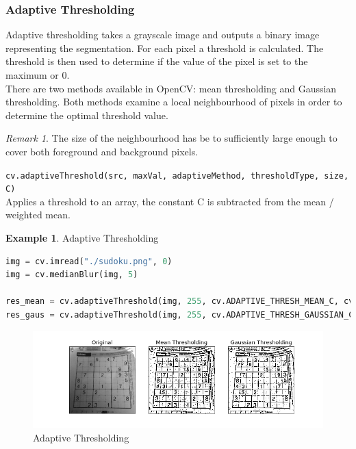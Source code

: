\documentclass{article}
\theoremstyle{definition}
\newtheorem{ex}{Example}[subsection]
\theoremstyle{remark}
\newtheorem*{rem}{Remark}
\newcommand{\func}[2]{\noindent\lstinline{#1}\\#2}
\begin{document}
\subsubsection{Adaptive Thresholding}

Adaptive thresholding takes a grayscale image and outputs a binary image representing the segmentation. For each pixel a threshold is calculated. The threshold is then used to determine if the value of the pixel is set to the maximum or 0.\\

There are two methods available in OpenCV: mean thresholding and Gaussian thresholding. Both methods examine a local neighbourhood of pixels in order to determine the optimal threshold value.\\

\begin{rem}
The size of the neighbourhood has be to sufficiently large enough to cover both foreground and background pixels.\\
\end{rem}


\func{cv.adaptiveThreshold(src, maxVal, adaptiveMethod, thresholdType, size, C)}{Applies a threshold to an array, the constant C is subtracted from the mean / weighted mean.}


\begin{ex} Adaptive Thresholding
\begin{lstlisting}[language=Python]
img = cv.imread("./sudoku.png", 0)
img = cv.medianBlur(img, 5)

res_mean = cv.adaptiveThreshold(img, 255, cv.ADAPTIVE_THRESH_MEAN_C, cv.THRESH_BINARY, 11, 2)
res_gaus = cv.adaptiveThreshold(img, 255, cv.ADAPTIVE_THRESH_GAUSSIAN_C, cv.THRESH_BINARY, 11, 2) 
\end{lstlisting}
\begin{figure}[h!]
    \centering
    \includegraphics[width=\textwidth]{ocv_ith_adaptive}
    \caption{Adaptive Thresholding}
    \label{fig:ocv_ith_adap}
\end{figure}
\end{ex}
\end{document}
